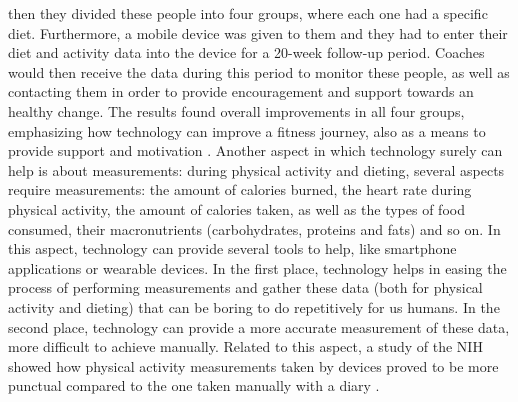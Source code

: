 then they divided these people into four groups, where each one had a specific diet. Furthermore, a mobile device was given to them and they had to enter their diet and activity data into the device for a 20-week follow-up period. Coaches would then receive the data during this period to monitor these people, as well as contacting them in order to provide encouragement and support towards an healthy change. The results found overall improvements in all four groups, emphasizing how technology can improve a fitness journey, also as a means to provide support and motivation \cite{NihMobileStudies}. \newline Another aspect in which technology surely can help is about measurements: during physical activity and dieting, several aspects require measurements: the amount of calories burned, the heart rate during physical activity, the amount of calories taken, as well as the types of food consumed, their macronutrients (carbohydrates, proteins and fats) and so on. In this aspect, technology can provide several tools to help, like smartphone applications or wearable devices. \newline In the first place, technology helps in easing the process of performing measurements and gather these data (both for physical activity and dieting) that can be boring to do repetitively for us humans. In the second place, technology can provide a more accurate measurement of these data, more difficult to achieve manually. Related to this aspect, a study of the NIH showed how physical activity measurements taken by devices proved to be more punctual compared to the one taken manually with a diary \cite{NihDeviceMeasurements}.%
